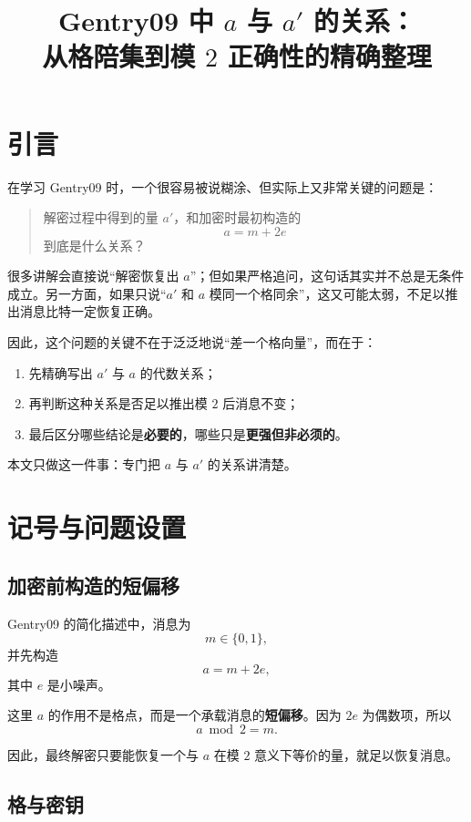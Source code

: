 \documentclass[12pt,a4paper]{article}
\title{Gentry09 中 \(a\) 与 \(a'\) 的关系：\\
从格陪集到模 \(2\) 正确性的精确整理}
\author{}
\date{}
\begin{document}
\maketitle

\tableofcontents
\newpage

\section{引言}

在学习 Gentry09 时，一个很容易被说糊涂、但实际上又非常关键的问题是：

\begin{quote}
解密过程中得到的量 \(a'\)，和加密时最初构造的
\[
a=m+2e
\]
到底是什么关系？
\end{quote}

很多讲解会直接说“解密恢复出 \(a\)”；但如果严格追问，这句话其实并不总是无条件成立。另一方面，如果只说“\(a'\) 和 \(a\) 模同一个格同余”，这又可能太弱，不足以推出消息比特一定恢复正确。

因此，这个问题的关键不在于泛泛地说“差一个格向量”，而在于：

\begin{enumerate}[label=\arabic*.]
    \item 先精确写出 \(a'\) 与 \(a\) 的代数关系；
    \item 再判断这种关系是否足以推出模 \(2\) 后消息不变；
    \item 最后区分哪些结论是\textbf{必要的}，哪些只是\textbf{更强但非必须的}。
\end{enumerate}

本文只做这一件事：专门把 \(a\) 与 \(a'\) 的关系讲清楚。

\section{记号与问题设置}

\subsection{加密前构造的短偏移}

Gentry09 的简化描述中，消息为
\[
m\in\{0,1\},
\]
并先构造
\[
a = m + 2e,
\]
其中 \(e\) 是小噪声。

这里 \(a\) 的作用不是格点，而是一个承载消息的\textbf{短偏移}。因为 \(2e\) 为偶数项，所以
\[
a \bmod 2 = m.
\]

因此，最终解密只要能恢复一个与 \(a\) 在模 \(2\) 意义下等价的量，就足以恢复消息。

\subsection{格与密钥}
\end{document}
